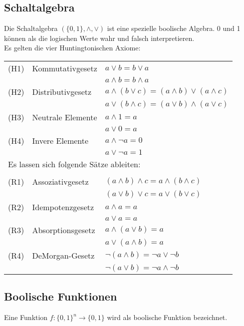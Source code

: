 \documentclass[12pt]{article}
\begin{document}
\subsection{Schaltalgebra}
Die Schaltalgebra $(\{0,1\}, \land, \lor)$ ist eine spezielle boolische Algebra. 0 und 1 können als die logischen Werte wahr und falsch interpretieren. \\
Es gelten die vier Huntingtonischen Axiome: \\
\newline
\begin{tabular}{l l l}
    (H1) & Kommutativgesetz & $a \lor b = b \lor a$ \\
    & & $a \land b = b \land a$ \\
    (H2) & Distributivgesetz & $a \land (b \lor c) = (a \land b) \lor (a \land c)$ \\
    & & $a \lor (b \land c) = (a \lor b) \land (a \lor c)$ \\
    (H3) & Neutrale Elemente & $a \land 1 = a$ \\
    & & $a \lor 0 = a$ \\
    (H4) & Invere Elemente & $a \land \neg a = 0$ \\
    & & $a \lor \neg a = 1$ \\
    \multicolumn{3}{l}{Es lassen sich folgende Sätze ableiten:} \\ \\
    (R1) & Assoziativgesetz & $(a \land b) \land c = a \land (b \land c)$ \\
    & & $(a \lor b) \lor c = a \lor (b \lor c)$ \\
    (R2) & Idempotenzgesetz & $a \land a = a$ \\
    & & $a \lor a = a$ \\
    (R3) & Absorptionsgesetz & $a \land (a \lor b) = a$ \\
    & & $a \lor (a \land b) = a$ \\
    (R4) & DeMorgan-Gesetz & $\neg(a \land b) = \neg a \lor \neg b$ \\
    & & $\neg(a \lor b) = \neg a \land \neg b$ \\
\end{tabular}
\subsection{Boolische Funktionen}
Eine Funktion $f: \{0,1\}^n \rightarrow \{0,1\}$ wird als boolische Funktion bezeichnet.
\end{document}
